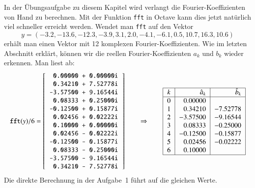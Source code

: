 In der Übungsaufgabe zu diesem Kapitel wird verlangt die
Fourier-Koeffizienten von Hand zu berechnen.
Mit der Funktion \texttt{fft} in Octave kann dies jetzt natürlich viel
schneller erreicht werden.
Wendet man \texttt{fft} auf den Vektor
\[
y = (-3.2, -13.6, -12.3, -3.9, 3.1, 2.0, -4.1, -6.1, 0.5, 10.7, 16.3, 10.6 )
\]
erhält man einen Vektor mit 12 komplexen Fourier-Koeffizienten.
Wie im letzten Abschnitt erklärt, können wir die reellen Fourier-Koeffizienten
$a_k$ und $b_k$ wieder erkennen.
Man liest ab:
\[
\texttt{fft}(y) / 6
=
\left[
\begin{tabular}{>{\tt}r}
   0.00000 + 0.00000i\\
   0.34210 + 7.52778i\\
  -3.57500 + 9.16544i\\
   0.08333 + 0.25000i\\
  -0.12500 + 0.15877i\\
   0.02456 + 0.02222i\\
   0.10000 + 0.00000i\\
   0.02456 - 0.02222i\\
  -0.12500 - 0.15877i\\
   0.08333 - 0.25000i\\
  -3.57500 - 9.16544i\\
   0.34210 - 7.52778i
\end{tabular}
\right]
\qquad\Rightarrow\qquad
\begin{tabular}{|>{$}c<{$}|>{$}r<{$}|>{$}r<{$}|}
\hline
k     &\hat{a}_k&\hat{b}_k\\
\hline
0     & 0.00000&        \\
1     & 0.34210&-7.52778\\
2     &-3.57500&-9.16544\\
3     & 0.08333&-0.25000\\
4     &-0.12500&-0.15877\\
5     & 0.02456&-0.02222\\
6     & 0.10000&        \\
\hline
\end{tabular}
\]
Die direkte Berechnung in der Aufgabe~1 führt auf die gleichen Werte.



